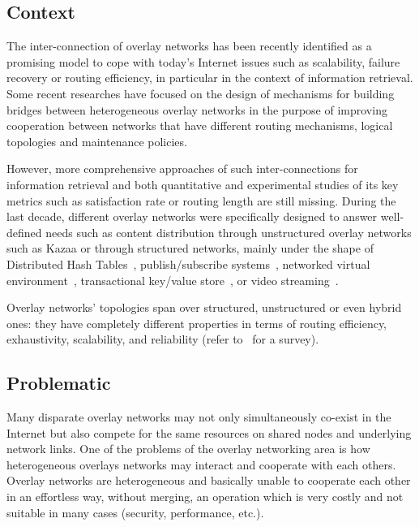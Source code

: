 

\subsection{Context}
The inter-connection of overlay networks has been recently identified
as a promising model to cope with today's Internet issues such as
scalability, failure recovery or routing efficiency, in particular in
the context of information retrieval. Some recent researches have
focused on the design of mechanisms for building bridges between
heterogeneous overlay networks in the purpose of improving cooperation
between networks that have different routing mechanisms, logical
topologies and maintenance policies.

However, more comprehensive approaches of such inter-connections for
information retrieval and both quantitative and experimental studies
of its key metrics such as satisfaction rate or routing length are
still missing. During the last decade, different overlay networks were
specifically designed to answer well-defined needs such as content
distribution through unstructured overlay networks such as Kazaa or
through structured networks, mainly under the shape of Distributed
Hash Tables~\cite{CAN,Chord,Pastry,symphony},
publish/subscribe systems~\cite{castro_scribe:large-scale_2002,
  LBCC08,CCL08}, networked virtual
environment~\cite{knutsson_peer-to-peer_2004}, transactional key/value
store~\cite{schtt_scalaris:_2008}, or video
streaming~\cite{xinyan_zhang_coolstreaming/donet:data-driven_2005}.

Overlay networks' topologies span over structured, unstructured or
even hybrid ones: they have completely different properties in terms
of routing efficiency, exhaustivity, scalability, and reliability
(refer to~\cite{P2PBOOK} for a survey).

\subsection{Problematic}
%
Many disparate overlay networks may not only simultaneously co-exist
in the Internet but also compete for the same resources on shared
nodes and underlying network links. One of the problems of the overlay
networking area is how heterogeneous overlays networks may interact
and cooperate with each others. Overlay networks are heterogeneous and
basically unable to cooperate each other in an effortless way, without
merging, an operation which is very costly and not suitable in many
cases (security, performance, etc.).

